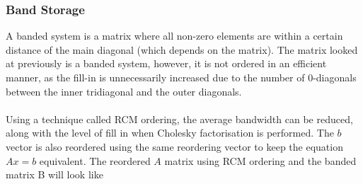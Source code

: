 \documentclass[12pt,a4paper]{article}
\begin{document}
\subsubsection{Band Storage}
A banded system is a matrix where all non-zero elements are within a certain distance of the main diagonal (which depends on the matrix). The matrix looked at previously is a banded system, however, it is not ordered in an efficient manner, as the fill-in is unnecessarily increased due to the number of 0-diagonals between the inner tridiagonal and the outer diagonals. 
\\\\
Using a technique called RCM ordering, the average bandwidth can be reduced, along with the level of fill in when Cholesky factorisation is performed. The $b$ vector is also reordered using the same reordering vector to keep the equation $Ax=b$ equivalent. The reordered $A$ matrix using RCM ordering and the banded matrix B will look like
\end{document}
